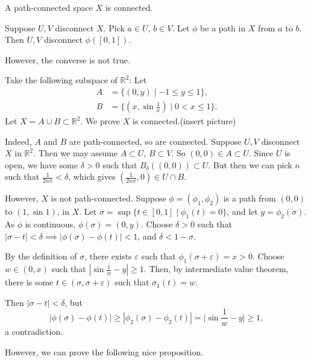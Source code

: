 \documentclass[12pt]{article}
\begin{document}
\begin{proposition}
	A path-connected space $X$ is connected.
\end{proposition}

\begin{proofbox}
	Suppose $U, V$ disconnect $X$. Pick $a \in U$, $b \in V$. Let $\phi$ be a path in $X$ from $a$ to $b$. Then $U, V$ disconnect $\phi([0,1])$.
\end{proofbox}

However, the converse is not true.

\begin{exbox}
	Take the following subspace of $\mathbb{R}^2$: Let
	\begin{align*}
		A &= \{(0, y) \mid -1 \leq y \leq 1\},\\
		B &= \{(x, \sin \frac{1}{x}) \mid 0 < x \leq 1\}.
	\end{align*}
	Let $X = A \cup B \subset \mathbb{R}^2$. We prove $X$ is connected.(insert picture)

	Indeed, $A$ and $B$ are path-connected, so are connected. Suppose $U, V$ disconnect $X$ in $\mathbb{R}^2$. Then we may assume $A \subset U$, $B \subset V$. So $(0, 0) \in A \subset U$. Since $U$ is open, we have some $\delta > 0$ such that $B_{\delta}((0,0)) \subset U$. But then we can pick $n$ such that $\frac{1}{2n\pi} < \delta$, which gives $(\frac{1}{2n\pi}, 0) \in U \cap B$.

	However, $X$ is not path-connected. Suppose $\phi = (\phi_1, \phi_2)$ is a path from $(0,0)$ to $(1, \sin 1)$, in $X$. Let $\sigma = \sup\{t \in [0,1]\mid\phi_1(t) = 0\}$, and let $y = \phi_2(\sigma)$. As $\phi$ is continuous, $\phi(\sigma) = (0, y)$. Choose $\delta > 0$ such that $|\sigma - t| < \delta \implies |\phi(\sigma) - \phi(t)| < 1$, and $\delta < 1 - \sigma$.

	By the definition of $\sigma$, there exists $\varepsilon$ such that $\phi_1(\sigma + \varepsilon) = x > 0$. Choose $w \in (0, x)$ such that $|\sin \frac{1}{w} - y| \geq 1$. Then, by intermediate value theorem, there is some $t \in(\sigma,\sigma+\varepsilon)$ such that $\sigma_1(t) = w$.

	Then  $|\sigma - t| < \delta$, but
	\[
		|\phi(\sigma) - \phi(t)| \geq |\phi_2(\sigma) - \phi_2(t)| = \biggl|\sin \frac{1}{w} - y\biggr| \geq 1
	,\]
	a contradiction.
\end{exbox}

However, we can prove the following nice proposition.
\end{document}
